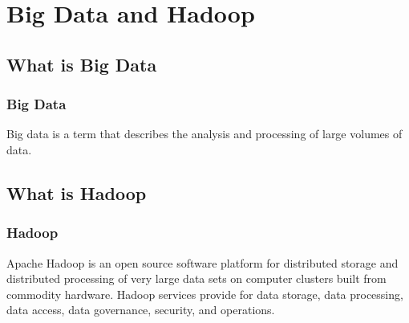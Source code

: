 \section{Big Data and Hadoop} 

\subsection{What is Big Data} 

\begin{frame}
	\frametitle{Big Data}	
	Big data is a term that describes the analysis and processing of large volumes of data.
\end{frame}

\subsection{What is Hadoop} 
\begin{frame}
	\frametitle{Hadoop}
		Apache Hadoop is an open source software platform for distributed storage and distributed processing of very large data sets on computer clusters built from commodity hardware.  Hadoop services provide for data storage, data processing, data access, data governance, security, and operations.
\end{frame}